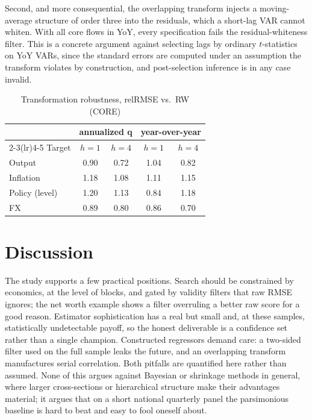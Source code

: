 \documentclass[conference]{IEEEtran}
\begin{document}
Second, and more consequential, the overlapping transform injects a moving-average structure of order three into the residuals, which a short-lag VAR cannot whiten. With all core flows in YoY, every specification fails the residual-whiteness filter. This is a concrete argument against selecting lags by ordinary $t$-statistics on YoY VARs, since the standard errors are computed under an assumption the transform violates by construction, and post-selection inference is in any case invalid.

\begin{table}[t]
\caption{Transformation robustness, relRMSE vs.\ RW (CORE)}
\label{tab:yoy}
\centering
\small
\begin{tabular}{@{}lcccc@{}}
\toprule
 & \multicolumn{2}{c}{annualized q} & \multicolumn{2}{c}{year-over-year} \\
\cmidrule(lr){2-3}\cmidrule(lr){4-5}
Target & $h{=}1$ & $h{=}4$ & $h{=}1$ & $h{=}4$ \\
\midrule
Output    & 0.90 & 0.72 & 1.04 & 0.82 \\
Inflation & 1.18 & 1.08 & 1.11 & 1.15 \\
Policy (level) & 1.20 & 1.13 & 0.84 & 1.18 \\
FX        & 0.89 & 0.80 & 0.86 & 0.70 \\
\bottomrule
\end{tabular}
\end{table}

\section{Discussion}
The study supports a few practical positions. Search should be constrained by economics, at the level of blocks, and gated by validity filters that raw RMSE ignores; the net worth example shows a filter overruling a better raw score for a good reason. Estimator sophistication has a real but small and, at these samples, statistically undetectable payoff, so the honest deliverable is a confidence set rather than a single champion. Constructed regressors demand care: a two-sided filter used on the full sample leaks the future, and an overlapping transform manufactures serial correlation. Both pitfalls are quantified here rather than assumed. None of this argues against Bayesian or shrinkage methods in general, where larger cross-sections or hierarchical structure make their advantages material; it argues that on a short national quarterly panel the parsimonious baseline is hard to beat and easy to fool oneself about.
\end{document}
